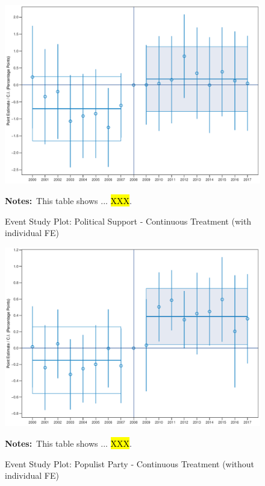\documentclass[11pt]{article}
\begin{document}
\begin{figure}[htbp!]
    \centering
    \caption{Event Study Plot: Political Support - Continuous Treatment (with individual FE)}\label{fig:dynamic_did_cbk_past_mean_ps_std_ife}
    \includegraphics[width=1\linewidth]{events/dynamic_did_cbk_past_mean_ps_std_ife}
    \begin{tablenotes}
        \footnotesize
        \item \textbf{Notes:}~This table shows ... \hl{XXX}.
    \end{tablenotes} 
\end{figure}

\begin{figure}[htbp!]
    \centering
    \caption{Event Study Plot: Populist Party - Continuous Treatment (without individual FE)}\label{fig:dynamic_did_cbk_past_mean_pp_std_noife}
    \includegraphics[width=1\linewidth]{events/dynamic_did_cbk_past_mean_pp_std_noife}
    \begin{tablenotes}
        \footnotesize
        \item \textbf{Notes:}~This table shows ... \hl{XXX}.
    \end{tablenotes} 
\end{figure}
\end{document}
